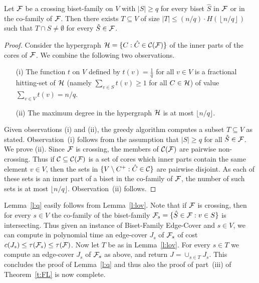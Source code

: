 \begin{lemma} \label{l:lov}
Let ${\cal F}$ be a crossing biset-family on $V$ with $|S| \geq q$
for every biset $\hat{S}$ in ${\cal F}$ or in the co-family of ${\cal F}$.
Then there exists $T \subseteq V$ of size 
$|T| \leq (n/q) \cdot H\left(\left\lfloor n/q \right\rfloor\right)$ 
such that $T \cap S \neq \emptyset$ for every $\hat{S} \in {\cal F}$.
\end{lemma}
\begin{proof}
Consider the hypergraph ${\cal H}=\{C: \hat{C} \in {\cal C}({\cal F})\}$
of the inner parts of the cores of ${\cal F}$.
We combine the following two observations.  
\begin{itemize}
\item[(i)]
The function $t$ on $V$ defined by $t(v)=\frac{1}{q}$ for all $v \in V$ is a fractional 
hitting-set of ${\cal H}$ (namely $\sum_{v \in S} t(v) \geq 1$ for all $C \in {\cal H}$)
of value $\sum_{v \in V} t(v) = n/q$. 
\item[(ii)]
The maximum degree in the hypergraph ${\cal H}$ is at most $\lfloor n/q \rfloor$.
\end{itemize}
Given observations (i) and (ii), the greedy algorithm 
computes a subset $T \subseteq V$ as stated.
Observation~(i) follows from the assumption that $|S| \geq q$ for all $\hat{S} \in {\cal F}$.
We prove (ii). Since ${\cal F}$ is crossing, the members of ${\cal C}({\cal F})$ 
are pairwise non-crossing. Thus if ${\cal C} \subseteq {\cal C}({\cal F})$ is a set of cores
which inner parts contain the same element $v \in V$, then the sets in 
$\{V \setminus C^+:\hat{C} \in {\cal C}\}$ are pairwise disjoint.
As each of these sets is an inner part of a biset in the co-family of ${\cal F}$,
the number of such sets is at most $\lfloor n/q \rfloor$. Observation~(ii) follows.
\end{proof}

Lemma~\ref{l:q} easily follows from Lemma~\ref{l:lov}.
Note that if ${\cal F}$ is crossing, then 
for every $s \in V$ the co-family of the biset-family 
${\cal F}_s=\{\hat{S} \in {\cal F}:v \in S\}$ is intersecting.
Thus given an instance of {\sf Biset-Family Edge-Cover} and $s \in V$,
we can compute in polynomial time an edge-cover $J_s$ of ${\cal F}_s$ of cost
$c(J_s) \leq \tau({\cal F}_s) \leq \tau({\cal F})$.
Now let $T$ be as in Lemma~\ref{l:lov}. For every $s \in T$ we compute an edge-cover 
$J_s$ of ${\cal F}_s$ as above, and return $J=\cup_{s \in T}J_s$. 
This concludes the proof of Lemma~\ref{l:q} and thus also the proof of part~(iii)
of Theorem~\ref{t:FL} is now complete.

